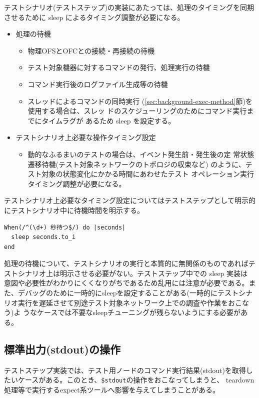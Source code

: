 テストシナリオ(テストステップ)の実装にあたっては、処理のタイミングを同期
させるために sleep によるタイミング調整が必要になる。
\begin{itemize}
 \item 処理の待機
       \begin{itemize}
        \item 物理OFSとOFCとの接続・再接続の待機
        \item テスト対象機器に対するコマンドの発行、処理実行の待機
        \item コマンド実行後のログファイル生成等の待機
        \item スレッドによるコマンドの同時実行
              (\ref{sec:background-exec-method}節)を使用する場合は、スレッ
              ドのスケジューリングのためにコマンド実行までにタイムラグが
              あるため sleep を設定する。
       \end{itemize}
 \item テストシナリオ上必要な操作タイミング設定
       \begin{itemize}
        \item 動的なふるまいのテストの場合は、イベント発生前・発生後の定
              常状態遷移待機(テスト対象ネットワークのトポロジの収束など)
              のように、テスト対象の状態変化にかかる時間にあわせたテスト
              オペレーション実行タイミング調整が必要になる。
       \end{itemize}
\end{itemize}

テストシナリオ上必要なタイミング設定についてはテストステップとして明示的
にテストシナリオ中に待機時間を明示する。
\begin{lstlisting}
When(/^(\d+) 秒待つ$/) do |seconds|
  sleep seconds.to_i
end
\end{lstlisting}

処理の待機について、テストシナリオの実行と本質的に無関係のものであればテ
ストシナリオ上は明示させる必要がない。テストステップ中での sleep 実装は
意図や必要性がわかりにくくなりがちであるため乱用には注意が必要である。ま
た、デバッグのために一時的にsleepを設定することがある(一時的にテストシナ
リオ実行を遅延させて別途テスト対象ネットワーク上での調査や作業をおこなう)よ
うなケースでは不要なsleepチューニングが残らないようにする必要がある。

  \subsection{標準出力(stdout)の操作}
テストステップ実装では、テスト用ノードのコマンド実行結果(stdout)を取得し
たいケースがある。このとき、\verb|$stdout|の操作をおこなってしまうと、
teardown処理等で実行するexpect系ツールへ影響を与えてしまうことがある。

